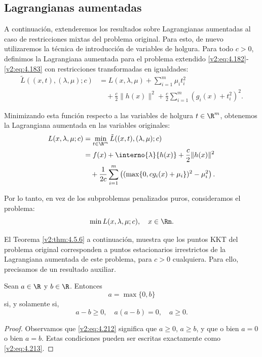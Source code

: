 \subsection{Lagrangianas aumentadas}\label{v2:sec:4.5.4}

A continuación, extenderemos los resultados sobre Lagrangianas aumentadas al caso de restricciones mixtas del problema original. Para esto, de nuevo utilizaremos la técnica de introducción de variables de holgura. Para todo $c > 0$, definimos la Lagrangiana aumentada para el problema extendido \eqref{v2:eq:4.182}-\eqref{v2:eq:4.183} con restricciones transformadas en igualdades:
\begin{align}
    \tilde{L}((x, t), (\lambda, \mu); c) &= L(x, \lambda, \mu) + \sum_{i=1}^m \mu_i t_i^2 \nonumber \\
    &\quad + \frac{c}{2}\|h(x)\|^2 + \frac{c}{2}\sum_{i=1}^m (g_i(x) + t_i^2)^2. \label{v2:eq:4.206}
\end{align}

Minimizando esta función respecto a las variables de holgura $t \in \R^m$, obtenemos la Lagrangiana aumentada en las variables originales:
\begin{align}
    L(x, \lambda, \mu; c) &= \min_{t \in \R^m} \tilde{L}((x, t), (\lambda, \mu); c) \nonumber \\
    &= f(x) + \interno{\lambda}{h(x)} + \frac{c}{2}\|h(x)\|^2 \nonumber \\
    &\quad + \frac{1}{2c}\sum_{i=1}^m \left( (\max\{0, cg_i(x) + \mu_i\})^2 - \mu_i^2 \right). \label{v2:eq:4.210}
\end{align}

Por lo tanto, en vez de los subproblemas penalizados puros, consideramos el problema:
\begin{equation}
    \min L(x, \lambda, \mu; c), \quad x \in \Rn. \label{v2:eq:4.211}
\end{equation}

El Teorema \ref{v2:thm:4.5.6} a continuación, muestra que los puntos KKT del problema original corresponden a puntos estacionarios irrestrictos de la Lagrangiana aumentada de este problema, para $c > 0$ cualquiera. Para ello, precisamos de un resultado auxiliar.

\begin{lemma}\label{v2:lem:4.5.5}
Sean $a \in \R$ y $b \in \R$. Entonces
\begin{equation}
    a = \max\{0, b\} \label{v2:eq:4.212}
\end{equation}
si, y solamente si,
\begin{equation}
    a - b \ge 0, \quad a(a - b) = 0, \quad a \ge 0. \label{v2:eq:4.213}
\end{equation}
\end{lemma}
\begin{proof}
Observamos que \eqref{v2:eq:4.212} significa que $a \ge 0$, $a \ge b$, y que o bien $a=0$ o bien $a=b$. Estas condiciones pueden ser escritas exactamente como \eqref{v2:eq:4.213}.
\end{proof}

